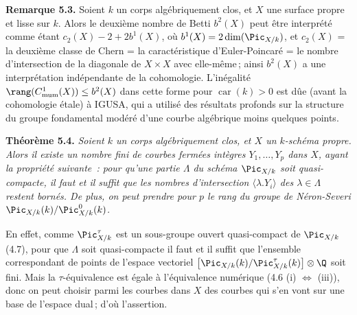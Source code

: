 
\textbf{Remarque 5.3.} Soient \(k\) un corps alg\'ebriquement clos, et \(X\) une surface propre et lisse sur \(k\). Alors le deuxi\`eme nombre de Betti \(b^2(X)\) peut \^etre interpr\'et\'e comme \'etant \(c_2(X)-2+2b^1(X)\), o\`u \(b^1(X)=2\dim(\Pic_{X/k})\), et \(c_2(X)\) = la deuxi\`eme classe de Chern = la caract\'eristique d'Euler-Poincar\'e = le nombre d'intersection de la diagonale de \(X\times X\) avec elle-m\^eme\,; ainsi \(b^2(X)\) a une interpr\'etation ind\'ependante de la cohomologie. L'in\'egalit\'e \(\rang(C^1_{\rm mum}(X))\le b^2(X)\) dans cette forme pour \(\operatorname{car}(k)>0\) est d\^ue (avant la cohomologie \'etale) \`a IGUSA, qui a utilis\'e des r\'esultats profonds sur la structure du groupe fondamental mod\'er\'e d'une courbe alg\'ebrique moins quelques points.

\textbf{Th\'eor\`eme 5.4.} \emph{Soient \(k\) un corps alg\'ebriquement clos, et \(X\) un \(k\)-sch\'ema propre. Alors il existe un nombre fini de courbes ferm\'ees int\`egres \(Y_1,\ldots,Y_p\) dans \(X\), ayant la propri\'et\'e suivante~: pour qu'une partie \(\Lambda\) du sch\'ema \(\Pic_{X/k}\) soit quasi-compacte, il faut et il suffit que les nombres d'intersection \(\langle\lambda.Y_i\rangle\) des \(\lambda\in\Lambda\) restent born\'es. De plus, on peut prendre pour \(p\) le rang du groupe de N\'eron-Severi \(\Pic_{X/k}(k)/\Pic^0_{X/k}(k)\).}

En effet, comme \(\Pic^\tau_{X/k}\) est un sous-groupe ouvert quasi-compact de \(\Pic_{X/k}\) (4.7), pour que \(\Lambda\) soit quasi-compacte il faut et il suffit que l'ensemble correspondant de points de l'espace vectoriel \(\bigl[\Pic_{X/k}(k)/\Pic^\tau_{X/k}(k)\bigr]\otimes\Q\) soit fini. Mais la \(\tau\)-\'equivalence est \'egale \`a l'\'equivalence num\'erique (4.6 (i) \(\Longleftrightarrow\) (iii)), donc on peut choisir parmi les courbes dans \(X\) des courbes qui s'en vont sur une base de l'espace dual\,; d'o\`u l'assertion.

